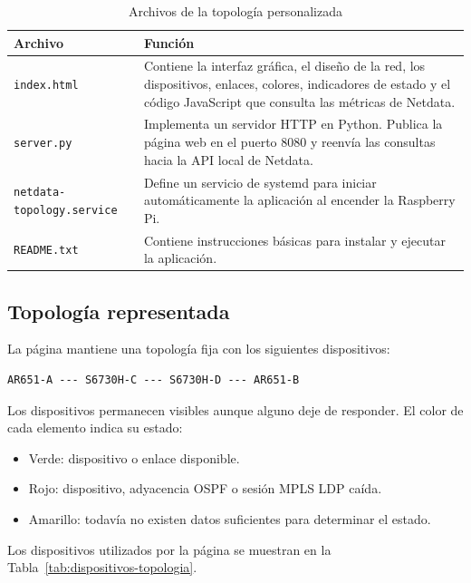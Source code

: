 \begin{table}[H]
\centering
\caption{Archivos de la topología personalizada}
\begin{tabular}{|l|p{9cm}|}
\hline
\textbf{Archivo} & \textbf{Función} \\ \hline
\texttt{index.html} &
Contiene la interfaz gráfica, el diseño de la red, los dispositivos, enlaces,
colores, indicadores de estado y el código JavaScript que consulta las métricas
de Netdata. \\ \hline

\texttt{server.py} &
Implementa un servidor HTTP en Python. Publica la página web en el puerto 8080
y reenvía las consultas hacia la API local de Netdata. \\ \hline

\texttt{netdata-topology.service} &
Define un servicio de systemd para iniciar automáticamente la aplicación al
encender la Raspberry Pi. \\ \hline

\texttt{README.txt} &
Contiene instrucciones básicas para instalar y ejecutar la aplicación. \\ \hline
\end{tabular}
\end{table}


\subsection{Topología representada}

La página mantiene una topología fija con los siguientes dispositivos:

\begin{verbatim}
AR651-A --- S6730H-C --- S6730H-D --- AR651-B
\end{verbatim}

Los dispositivos permanecen visibles aunque alguno deje de responder. El color
de cada elemento indica su estado:

\begin{itemize}
    \item Verde: dispositivo o enlace disponible.
    \item Rojo: dispositivo, adyacencia OSPF o sesión MPLS LDP caída.
    \item Amarillo: todavía no existen datos suficientes para determinar el
    estado.
\end{itemize}

Los dispositivos utilizados por la página se muestran en la
Tabla~\ref{tab:dispositivos-topologia}.

